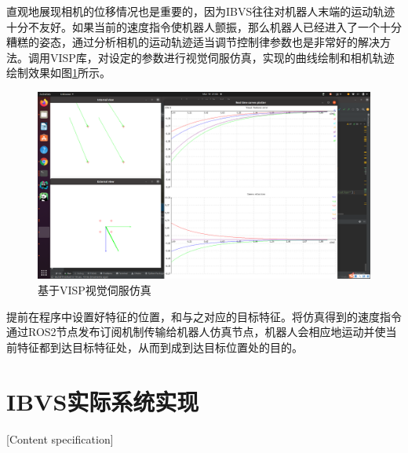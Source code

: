 \documentclass[fontset=fandol,type=bachelor,campus=harbin,bsmainpagenumberline=true]{hithesisbook}
\begin{document}
直观地展现相机的位移情况也是重要的，因为IBVS往往对机器人末端的运动轨迹十分不友好。如果当前的速度指令使机器人颤振，那么机器人已经进入了一个十分糟糕的姿态，通过分析相机的运动轨迹适当调节控制律参数也是非常好的解决方法。调用VISP库，对设定的参数进行视觉伺服仿真，实现的曲线绘制和相机轨迹绘制效果如图\ref{基于VISP视觉伺服仿真}所示。
\begin{figure}[h]
\centering
\includegraphics[width = 1.0\textwidth]{chapter2/基于VISP视觉伺服仿真}
\caption{基于VISP视觉伺服仿真}
\label{基于VISP视觉伺服仿真}
\end{figure}


提前在程序中设置好特征的位置，和与之对应的目标特征。将仿真得到的速度指令通过ROS2节点发布订阅机制传输给机器人仿真节点，机器人会相应地运动并使当前特征都到达目标特征处，从而到成到达目标位置处的目的。
\section{IBVS实际系统实现}[Content specification]
\end{document}
